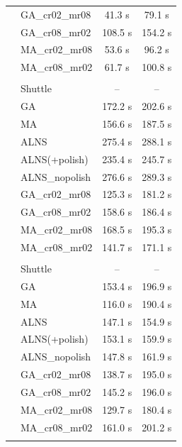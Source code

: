 \begin{table}[h]
\begin{tabular}{llcc}
 & GA_cr02_mr08 & 41.3 s & 79.1 s \\
 & GA_cr08_mr02 & 108.5 s & 154.2 s \\
 & MA_cr02_mr08 & 53.6 s & 96.2 s \\
 & MA_cr08_mr02 & 61.7 s & 100.8 s \\
\addlinespace
\multicolumn{4}{l}{\textit{Flood - Augmented}} \\
 & Shuttle & -- & -- \\
 & GA & 172.2 s & 202.6 s \\
 & MA & 156.6 s & 187.5 s \\
 & ALNS & 275.4 s & 288.1 s \\
 & ALNS(+polish) & 235.4 s & 245.7 s \\
 & ALNS_nopolish & 276.6 s & 289.3 s \\
 & GA_cr02_mr08 & 125.3 s & 181.2 s \\
 & GA_cr08_mr02 & 158.6 s & 186.4 s \\
 & MA_cr02_mr08 & 168.5 s & 195.3 s \\
 & MA_cr08_mr02 & 141.7 s & 171.1 s \\
\addlinespace
\multicolumn{4}{l}{\textit{Flood - Specialized}} \\
 & Shuttle & -- & -- \\
 & GA & 153.4 s & 196.9 s \\
 & MA & 116.0 s & 190.4 s \\
 & ALNS & 147.1 s & 154.9 s \\
 & ALNS(+polish) & 153.1 s & 159.9 s \\
 & ALNS_nopolish & 147.8 s & 161.9 s \\
 & GA_cr02_mr08 & 138.7 s & 195.0 s \\
 & GA_cr08_mr02 & 145.2 s & 196.0 s \\
 & MA_cr02_mr08 & 129.7 s & 180.4 s \\
 & MA_cr08_mr02 & 161.0 s & 201.2 s \\
\addlinespace
\bottomrule
\end{tabular}
\end{table}